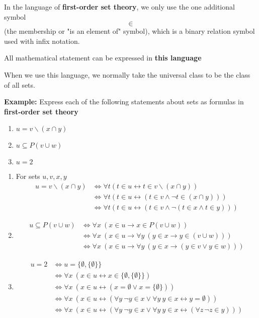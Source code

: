 


\begin{defn}
In the language of \textbf{first-order set theory}, we only use the one additional symbol $$\in$$
(the membership or "is an element of" symbol), which is a binary relation symbol used with infix notation.

\end{defn}

All mathematical statement can be expressed in \textbf{this language}

When we use this language, we normally take the universal class to be the class of all sets.

\textbf{Example: }Express each of the following statements about sets as formulas in \textbf{first-order set theory}

\begin{enumerate}
\item $u=v\backslash (x\cap y)$
\item $u\subseteq P(v\cup w)$
\item $u = 2$
\end{enumerate}

\begin{solution}
\begin{enumerate}
\item For sets $u,v,x,y$
\begin{align*}
u=v\backslash (x\cap y) & \iff \forall t (t\in u \leftrightarrow t\in v\backslash (x\cap y))\\
& \iff \forall t (t\in u \leftrightarrow (t\in v \wedge \neg t\in(x\cap y)))\\
& \iff \forall t (t\in u \leftrightarrow (t\in v \wedge \neg (t\in x \wedge t\in y)))
\end{align*}
\item 
\begin{align*}
u\subseteq P(v\cup w) & \iff \forall x\ (x\in u \to x\in P(v\cup w) )\\
& \iff \forall x\ (x\in u \to \forall y\ (y\in x \to y\in (v\cup w)))\\
& \iff \forall x\ (x\in u \to \forall y\ (y\in x \to (y\in v \vee y\in w)))
\end{align*}

\item 
\begin{align*}
    u=2 &\iff  u = \{\emptyset, \{\emptyset\}\}  \\
    & \iff \forall x\ ( x\in u \leftrightarrow x\in \{\emptyset, \{\emptyset\}\})\\
    & \iff \forall x\ (x\in u \leftrightarrow (x=\emptyset \vee x=\{\emptyset\}))\\
    & \iff \forall x\ (x\in u \leftrightarrow (\forall y \ \neg y \in x \vee \forall y\ y\in x \leftrightarrow y=\emptyset))\\
    & \iff \forall x\ (x\in u \leftrightarrow (\forall y \ \neg y \in x \vee \forall y\ y\in x \leftrightarrow (\forall z\, \neg z \in y)))
\end{align*}
\end{enumerate}
\end{solution}



